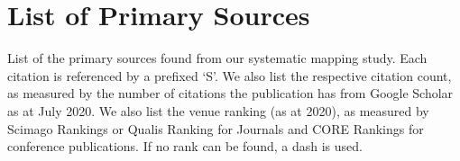 \clearpage
\section{List of Primary Sources}\label{tse2020:sec:primary-sources}

\nocite{PSRobillard:2009uk,PSRobillard:2011uv,PSKo:2011fb,PSNykaza:2002td,PSWatson:2013fx,PSJeong:2009tu,PSAghajani:2019bo,PSHaselbock:2018jd,PSInzunza:2018dn,PSMeng:2017cx,PSGeiger:2018fv,PSHead:2018baa,PSAversano:2017ic,PSRobillard:hk,PSWatson:2012uy,PSMaalej2013,PSParnas:2007fb,PSBottomley:2005fs,PSTaulavuori:2004el,PSKotula:1998wp,PSMcLellan:1998vu}


List of the primary sources found from our systematic mapping study. Each citation is referenced by a prefixed `S'. We also list the respective citation count, as measured by the number of citations the publication has from Google Scholar as at July 2020. We also list the venue ranking (as at 2020), as measured by Scimago Rankings or Qualis Ranking for Journals and CORE Rankings for conference publications. If no rank can be found, a dash is used.


